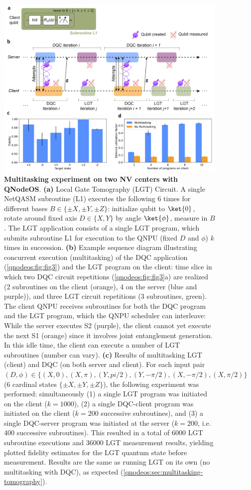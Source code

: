 \begin{figure}[htbp]
\centering
\includegraphics[width=0.95\linewidth]{figures/qnodeos/main/fig4/fig4.png}
\caption{\textbf{Multitasking experiment on two NV centers with QNodeOS}.
\textbf{(a)} Local Gate Tomography (LGT) Circuit. A single NetQASM subroutine (L1) executes the following 6 times for different bases $B \in \{\pm X, \pm Y, \pm Z\}$: initialize qubit to $\ket{0}$, rotate around fixed axis $D \in \{X,Y\}$ by angle $\ket{\phi}$, measure in $B$. The LGT application consists of a single LGT program, which submits subroutine L1 for execution to the QNPU (fixed $D$ and $\phi$) $k$ times in succession.
\textbf{(b)} Example sequence diagram illustrating concurrent execution (multitasking) of the DQC application (\cref{qnodeos:fig:fig3}) and the LGT program on the client: time slice in which two DQC circuit repetitions (\cref{qnodeos:fig:fig3}a) are realized (2 subroutines on the client (orange), 4 on the server (blue and purple)), and three LGT circuit repetitions (3 subroutines, green). The client QNPU receives subroutines for both the DQC program and the LGT program, which the QNPU scheduler can interleave: While the server executes S2 (purple), the client cannot yet execute the next S1 (orange) since it involves joint entanglement generation. In this idle time, the client can execute a number of LGT subroutines (number can vary).
\textbf{(c)} Results of multitasking LGT (client) and DQC (on both server and client). For each input pair $(D, \phi) \in \{ (X,0), (X,\pi), (Y,pi/2), (Y,-\pi/2), (X,-\pi/2), (X,\pi/2) \}$ (6 cardinal states $\{\pm X, \pm Y, \pm Z\}$), the following experiment was performed: simultaneously (1) a single LGT program was initiated on the client ($k=1000$), (2) a single DQC-client program was initiated on the client ($k=200$ successive subroutines), and (3) a single DQC-server program was initiated at the server ($k=200$, i.e. 400 successive subroutines). This resulted in a total of 6000 LGT subroutine executions and 36000 LGT measurement results, yielding plotted fidelity estimates for the LGT quantum state before measurement. Results are the same as running LGT on its own (no multitasking with DQC), as expected (\cref{qnodeos:sec:multitasking-tomography}).
}
\end{figure}

